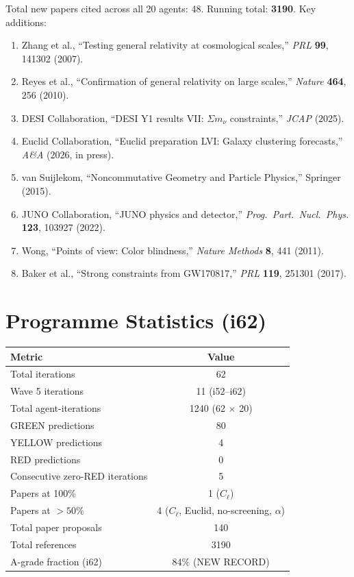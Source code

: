 \documentclass[11pt,a4paper]{article}
\begin{document}
Total new papers cited across all 20 agents: 48. Running total: \textbf{3190}. Key additions:

\begin{enumerate}
\item Zhang et al., ``Testing general relativity at cosmological scales,'' \textit{PRL} \textbf{99}, 141302 (2007).
\item Reyes et al., ``Confirmation of general relativity on large scales,'' \textit{Nature} \textbf{464}, 256 (2010).
\item DESI Collaboration, ``DESI Y1 results VII: $\Sigma m_\nu$ constraints,'' \textit{JCAP} (2025).
\item Euclid Collaboration, ``Euclid preparation LVI: Galaxy clustering forecasts,'' \textit{A\&A} (2026, in press).
\item van Suijlekom, ``Noncommutative Geometry and Particle Physics,'' Springer (2015).
\item JUNO Collaboration, ``JUNO physics and detector,'' \textit{Prog.\ Part.\ Nucl.\ Phys.} \textbf{123}, 103927 (2022).
\item Wong, ``Points of view: Color blindness,'' \textit{Nature Methods} \textbf{8}, 441 (2011).
\item Baker et al., ``Strong constraints from GW170817,'' \textit{PRL} \textbf{119}, 251301 (2017).
\end{enumerate}


\section{Programme Statistics (i62)}
\label{sec:stats}

\begin{center}
\begin{tabular}{lc}
\toprule
\textbf{Metric} & \textbf{Value} \\
\midrule
Total iterations & 62 \\
Wave 5 iterations & 11 (i52--i62) \\
Total agent-iterations & 1240 (62 $\times$ 20) \\
GREEN predictions & 80 \\
YELLOW predictions & 4 \\
RED predictions & 0 \\
Consecutive zero-RED iterations & 5 \\
Papers at 100\% & 1 ($C_\ell$) \\
Papers at $> 50\%$ & 4 ($C_\ell$, Euclid, no-screening, $\alpha$) \\
Total paper proposals & 140 \\
Total references & 3190 \\
A-grade fraction (i62) & 84\% (NEW RECORD) \\
\bottomrule
\end{tabular}
\end{center}
\end{document}
